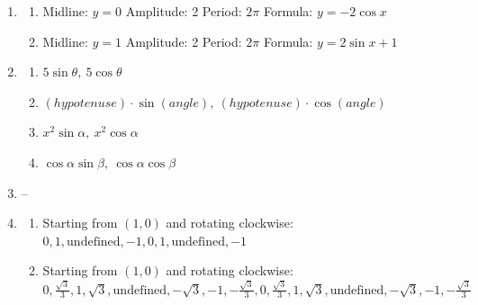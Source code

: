 \documentclass{article}
\begin{document}
\begin{enumerate}
\item

	\begin{enumerate}
	
	\item Midline: $y = 0$ \newline
		Amplitude: 2 \newline
		Period: $2\pi$ \newline
		Formula: $y = -2\cos{x}$
		
	\item Midline: $y = 1$ \newline
		Amplitude: 2 \newline
		Period: $2\pi$ \newline
		Formula: $y = 2\sin{x} + 1$
	
	\end{enumerate}
	
\item

	\begin{enumerate}
	
	\item $5\sin{\theta}, \ 5\cos{\theta}$
	
	\item $(hypotenuse)\cdot \sin{(angle)}, \ (hypotenuse) \cdot \cos{(angle)}$
	
	\item $x^2\sin{\alpha}, \ x^2\cos{\alpha}$
	
	\item $\cos{\alpha}\sin{\beta}, \ \cos{\alpha}\cos{\beta}$
	
	\end{enumerate}
	
\item --

\item 

	\begin{enumerate}
	
	\item Starting from $(1,0)$ and rotating clockwise: \newline
		$0, 1, \text{undefined}, -1, 0, 1, \text{undefined}, -1$
		
	\item Starting from $(1,0)$ and rotating clockwise: \newline
		$0, \frac{\sqrt{3}}{3}, 1, \sqrt{3}, \text{undefined}, -\sqrt{3}, -1, -\frac{\sqrt{3}}{3}, 0, \frac{\sqrt{3}}{3}, 1, \sqrt{3},
		\text{undefined}, -\sqrt{3}, -1, -\frac{\sqrt{3}}{3}$
	

\end{enumerate}
\end{enumerate}
\end{document}
